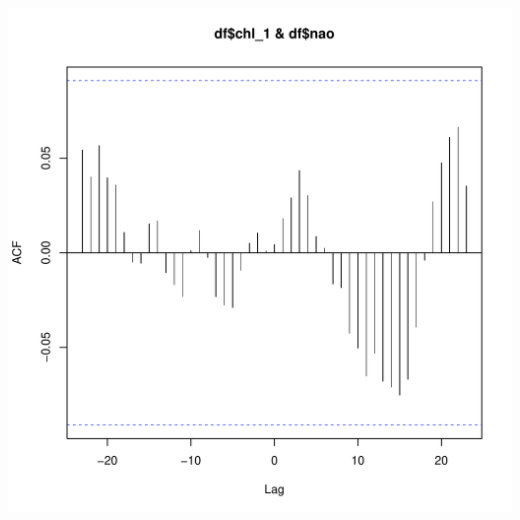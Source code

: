 \documentclass{article}\usepackage[]{graphicx}\usepackage[]{color}
\makeatletter
\def\maxwidth{ %
  \ifdim\Gin@nat@width>\linewidth
    \linewidth
  \else
    \Gin@nat@width
  \fi
}
\newenvironment{knitrout}{}{} %
\makeatother
\begin{document}
\begin{knitrout}
\includegraphics[width=\maxwidth]{figure/unnamed-chunk-32-2} 

\end{knitrout}
\end{document}
